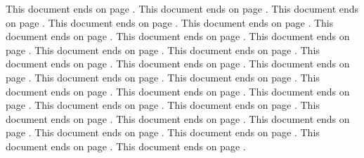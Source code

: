 \documentclass[a4paper]{article}
\begin{document}
This document ends on page \pageref{docend}.
This document ends on page \pageref{docend}.
This document ends on page \pageref{docend}.
This document ends on page \pageref{docend}.
This document ends on page \pageref{docend}.
This document ends on page \pageref{docend}.
This document ends on page \pageref{docend}.
This document ends on page \pageref{docend}.
This document ends on page \pageref{docend}.
This document ends on page \pageref{docend}.
This document ends on page \pageref{docend}.
This document ends on page \pageref{docend}.
This document ends on page \pageref{docend}.
This document ends on page \pageref{docend}.
This document ends on page \pageref{docend}.
This document ends on page \pageref{docend}.
This document ends on page \pageref{docend}.
This document ends on page \pageref{docend}.
This document ends on page \pageref{docend}.
This document ends on page \pageref{docend}.
This document ends on page \pageref{docend}.
This document ends on page \pageref{docend}.
This document ends on page \pageref{docend}.
This document ends on page \pageref{docend}.
This document ends on page \pageref{docend}.
This document ends on page \pageref{docend}.
This document ends on page \pageref{docend}.
\label{docend}
\end{document}
